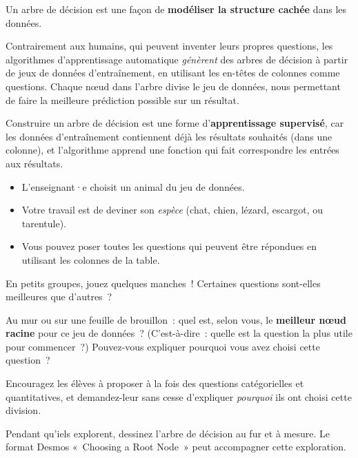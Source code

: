 \documentclass[12pt,a4paper]{article}
\begin{document}
\begin{keypointbox}
  Un arbre de décision est une façon de \textbf{modéliser la structure cachée} dans les données.

  Contrairement aux humains, qui peuvent inventer leurs propres questions, les algorithmes d'apprentissage automatique \emph{génèrent} des arbres de décision à partir de jeux de données d'entraînement, en utilisant les en-têtes de colonnes comme questions. Chaque nœud dans l'arbre divise le jeu de données, nous permettant de faire la meilleure prédiction possible sur un résultat.

  Construire un arbre de décision est une forme d'\textbf{apprentissage supervisé}, car les données d'entraînement contiennent déjà les résultats souhaités (dans une colonne), et l'algorithme apprend une fonction qui fait correspondre les entrées aux résultats.
\end{keypointbox}

\begin{activitybox}
  \begin{itemize}
    \item L'enseignant·e choisit un animal du jeu de données.
    \item Votre travail est de deviner son \emph{espèce} (chat, chien, lézard, escargot, ou tarentule).
    \item Vous pouvez poser toutes les questions qui peuvent être répondues en utilisant les colonnes de la table.
  \end{itemize}

  En petits groupes, jouez quelques manches~! Certaines questions sont-elles meilleures que d'autres~?

  Au mur ou sur une feuille de brouillon~: quel est, selon vous, le \textbf{meilleur nœud racine} pour ce jeu de données~? (C'est-à-dire~: quelle est la question la plus utile pour commencer~?) Pouvez-vous expliquer pourquoi vous avez choisi cette question~?
\end{activitybox}

\begin{instructornotes}
  Encouragez les élèves à proposer à la fois des questions catégorielles et quantitatives, et demandez-leur sans cesse d'expliquer \emph{pourquoi} ils ont choisi cette division.

  Pendant qu'iels explorent, dessinez l'arbre de décision au fur et à mesure. Le format Desmos «~Choosing a Root Node~» peut accompagner cette exploration.
\end{instructornotes}
\end{document}
